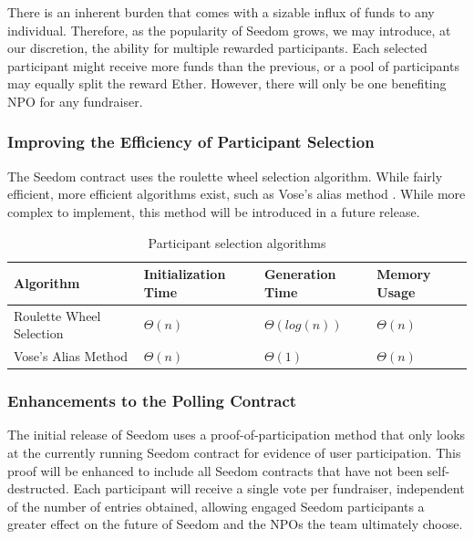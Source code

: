 \documentclass[11pt]{article}
\begin{document}
There is an inherent burden that comes with a sizable influx of funds to any individual. Therefore, as the popularity of Seedom grows, we may introduce, at our discretion, the ability for multiple rewarded participants. Each selected participant might receive more funds than the previous, or a pool of participants may equally split the reward Ether. However, there will only be one benefiting NPO for any fundraiser.

\subsubsection{Improving the Efficiency of Participant Selection}

The Seedom contract uses the roulette wheel selection algorithm. While fairly efficient, more efficient algorithms exist, such as Vose's alias method \cite{8}. While more complex to implement, this method will be introduced in a future release.

\begin{table}[H]
\begin{center}
\begin{tabular}{| l | l | l | l |}
\hline
\textbf{Algorithm} & \textbf{Initialization Time} & \textbf{Generation Time} & \textbf{Memory Usage} \\ \hline
Roulette Wheel Selection & $\Theta(n)$ & $\Theta(log(n))$ & $\Theta(n)$ \\ \hline
Vose's Alias Method & $\Theta(n)$ & $\Theta(1)$ & $\Theta(n)$ \\ \hline
\end{tabular}
\caption{Participant selection algorithms}
\label{tab:participantSelectionAlgorithms}
\end{center}
\end{table}

\subsubsection{Enhancements to the Polling Contract}
\label{sec:enhancementsToThePollingContract}

The initial release of Seedom uses a proof-of-participation method that only looks at the currently running Seedom contract for evidence of user participation. This proof will be enhanced to include all Seedom contracts that have not been self-destructed. Each participant will receive a single vote per fundraiser, independent of the number of entries obtained, allowing engaged Seedom participants a greater effect on the future of Seedom and the NPOs the team ultimately choose.
\end{document}
